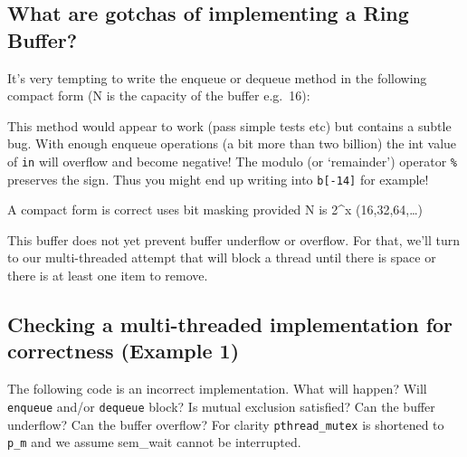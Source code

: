 \subsection{What are gotchas of implementing a Ring
Buffer?}\label{what-are-gotchas-of-implementing-a-ring-buffer}

It's very tempting to write the enqueue or dequeue method in the
following compact form (N is the capacity of the buffer e.g.~16):

\begin{Shaded}
\end{Shaded}

This method would appear to work (pass simple tests etc) but contains a
subtle bug. With enough enqueue operations (a bit more than two billion)
the int value of \texttt{in} will overflow and become negative! The
modulo (or `remainder') operator \texttt{\%} preserves the sign. Thus
you might end up writing into \texttt{b{[}-14{]}} for example!

A compact form is correct uses bit masking provided N is 2\^{}x
(16,32,64,\ldots{})

\begin{Shaded}
\begin{Highlighting}[]
\NormalTok{b[ (in++) & (N}\NormalTok{) ] = value;}
\end{Highlighting}
\end{Shaded}

This buffer does not yet prevent buffer underflow or overflow. For that,
we'll turn to our multi-threaded attempt that will block a thread until
there is space or there is at least one item to remove.

\subsection{Checking a multi-threaded implementation for correctness
(Example
1)}\label{checking-a-multi-threaded-implementation-for-correctness-example-1}

The following code is an incorrect implementation. What will happen?
Will \texttt{enqueue} and/or \texttt{dequeue} block? Is mutual exclusion
satisfied? Can the buffer underflow? Can the buffer overflow? For
clarity \texttt{pthread\_mutex} is shortened to \texttt{p\_m} and we
assume sem\_wait cannot be interrupted.

